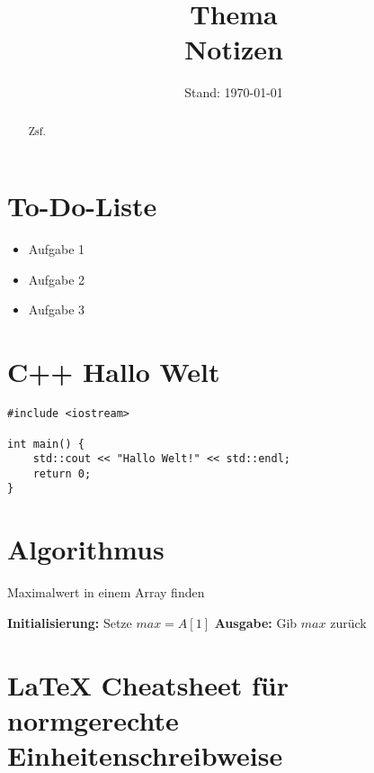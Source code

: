 \documentclass[a4paper,BCOR=12mm]{scrartcl}  %
\title{Thema \\
       Notizen}
\author{}
\date{Stand: \today}
\begin{document}
\maketitle

\begin{abstract}
    Zsf.
\end{abstract}
    
\tableofcontents

\section{To-Do-Liste}
\begin{itemize}[label=] %
    \item Aufgabe 1
    \item Aufgabe 2
    \item Aufgabe 3
\end{itemize}

\section*{C++ Hallo Welt}

\begin{lstlisting}[caption={Hallo Welt in C++}]
#include <iostream>

int main() {
    std::cout << "Hallo Welt!" << std::endl;
    return 0;
}
\end{lstlisting}


\section*{Algorithmus}

\begin{algorithm}[H]
\caption{Maximalwert in einem Array finden}

\textbf{Initialisierung:} Setze $max = A[1]$\;
\textbf{Ausgabe:} Gib $max$ zurück\;

\end{algorithm}

\section{\LaTeX{} Cheatsheet für normgerechte Einheitenschreibweise}
\end{document}
